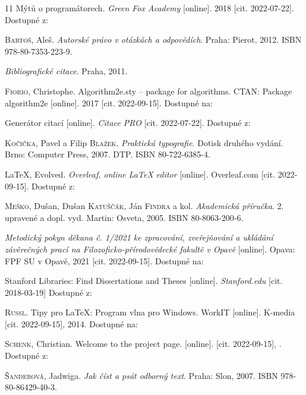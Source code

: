 \begin{thebibliography}{99}


11 Mýtů o programátorech. \emph{Green Fox Academy} [online]. 2018 [cit. 2022-07-22]. Dostupné z: 

\textsc{Bartoš}, Aleš. \emph{Autorské právo v otázkách a odpovědích}. Praha: Pierot, 2012. ISBN 978-80-7353-223-9.

\emph{Bibliografické citace}. Praha, 2011.

\textsc{Fiorio}, Christophe. Algorithm2e.sty -- package for algorithms. CTAN: Package algorithm2e [online]. 2017 [cit. 2022-09-15]. Dostupné na: 

Generátor citací [online]. \emph{Citace PRO} [cit. 2022-07-22]. Dostupné z: 

\textsc{Kočička}, Pavel a Filip \textsc{Blažek}. \emph{Praktická typografie}. Dotisk druhého vydání. Brno: Computer Press, 2007. DTP. ISBN 80-722-6385-4.


\LaTeX, Evolved. \emph{Overleaf, online \LaTeX{} editor} [online]. Overleaf.com [cit. 2022-09-15]. Dostupné z: 


\textsc{Meško}, Dušan, Dušan \textsc{Katuščák}, Ján \textsc{Findra} a kol. \emph{Akademická příručka}. 2. upravené a dopl. vyd. Martin: Osveta, 2005. ISBN 80-8063-200-6.

\emph{Metodický pokyn děkana č. 1/2021 ke zpracování, zveřejňování a ukládání závěrečných prací na Filozoficko-přírodovědecké fakultě v Opavě} [online]. Opava: FPF SU v Opavě, 2021 [cit. 2022-09-15]. Dostupné na: 

Stanford Libraries: Find Dissertations and Theses [online]. \emph{Stanford.edu} [cit. 2018-03-19] Dostupné z: 


\textsc{Russl}. Tipy pro LaTeX: Program vlna pro Windows. WorkIT [online]. K-media [cit. 2022-09-15], 2014. Dostupné na:

\textsc{Schenk}, Christian. Welcome to the \MikTeX{} project page. \MikTeX{} [online]. [cit. 2022-09-15], . Dostupné z: 

\textsc{Šanderová}, Jadwiga. \emph{Jak číst a psát odborný text}. Praha: Slon, 2007. ISBN 978-80-86429-40-3.



\end{thebibliography}



